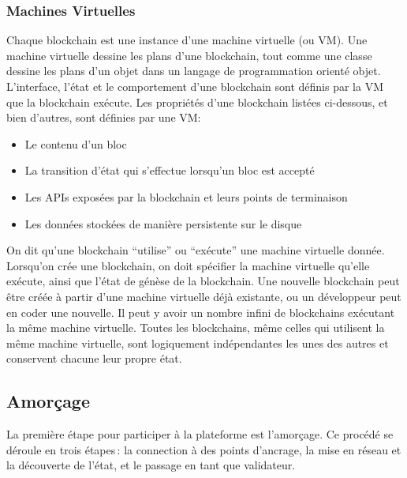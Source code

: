 \documentclass[runningheads,francais,a4paper]{llncs}
\begin{document}
\subsubsection{Machines Virtuelles}
Chaque blockchain est une instance d'une machine virtuelle (ou VM). Une machine virtuelle dessine les plans d'une
blockchain, tout comme une classe dessine les plans d'un objet dans un langage de programmation orienté objet.
L'interface, l'état et le comportement d'une blockchain sont définis par la VM que la blockchain exécute. Les propriétés
d'une blockchain listées ci-dessous, et bien d'autres, sont définies par une VM:
\begin{itemize}
\item Le contenu d'un bloc
\item La transition d'état qui s'effectue lorsqu'un bloc est accepté
\item Les APIs exposées par la blockchain et leurs points de terminaison
\item Les données stockées de manière persistente sur le disque
\end{itemize}

On dit qu'une blockchain ``utilise'' ou ``exécute'' une machine virtuelle donnée. Lorsqu'on crée une blockchain, on
doit spécifier la machine virtuelle qu'elle exécute, ainsi que l'état de génèse de la blockchain. Une nouvelle
blockchain peut être créée à partir d'une machine virtuelle déjà existante, ou un développeur peut en coder une
nouvelle. Il peut y avoir un nombre infini de blockchains exécutant la même machine virtuelle. Toutes les blockchains,
même celles qui utilisent la même machine virtuelle, sont logiquement indépendantes les unes des autres et conservent
chacune leur propre état.

\subsection{Amorçage}
La première étape pour participer à la plateforme \AVAPlatformName{} est l'amorçage. Ce procédé se déroule en trois
étapes\,: la connection à des points d'ancrage, la mise en réseau et la découverte de l'état, et le passage en tant
que validateur.
\end{document}
